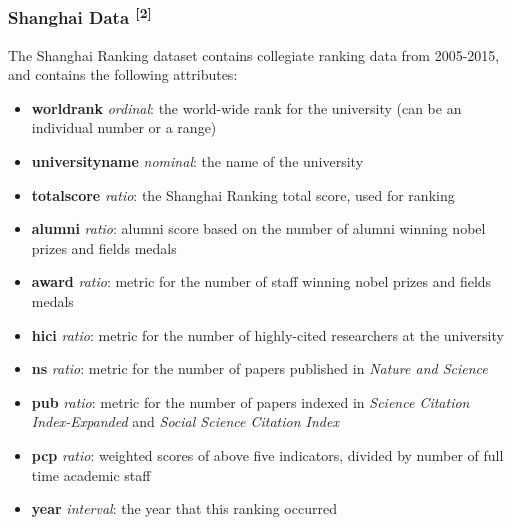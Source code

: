 \documentclass[12pt]{article}
\begin{document}
\subsubsection{Shanghai Data \textsuperscript{[2]}}
The Shanghai Ranking dataset contains collegiate ranking data from 2005-2015, and contains the following attributes:
\begin{itemize}
\item \textbf{world\textunderscore rank} \textit{ordinal}: the world-wide rank for the university (can be an individual number or a range)
\item \textbf{university\textunderscore name} \textit{nominal}: the name of the university
\item \textbf{total\textunderscore score} \textit{ratio}: the Shanghai Ranking total score, used for ranking
\item \textbf{alumni} \textit{ratio}: alumni score based on the number of alumni winning nobel prizes and fields medals
\item \textbf{award} \textit{ratio}: metric for the number of staff winning nobel prizes and fields medals
\item \textbf{hici} \textit{ratio}: metric for the number of highly-cited researchers at the university
\item \textbf{ns} \textit{ratio}: metric for the number of papers published in \textit{Nature and Science}
\item \textbf{pub} \textit{ratio}: metric for the number of papers indexed in \textit{Science Citation Index-Expanded} and \textit{Social Science Citation Index}
\item \textbf{pcp} \textit{ratio}: weighted scores of above five indicators, divided by number of full time academic staff
\item \textbf{year} \textit{interval}: the year that this ranking occurred
\end{itemize}
\end{document}
